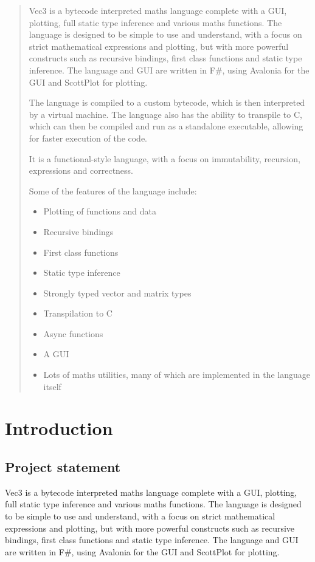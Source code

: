 \documentclass[a4paper, oneside, 11pt]{report}
\begin{document}
\begin{abstract}
Vec3 is a bytecode interpreted maths language complete with a GUI, plotting, full static type inference and various 
maths functions.
The language is designed to be simple to use and understand, with a focus on strict mathematical expressions and 
plotting, but with more powerful constructs such as recursive bindings, first class functions and static type inference.
The language and GUI are written in F\#, using Avalonia\citep{avalonia} for the GUI and ScottPlot\citep{scottPlot} for plotting.
    
The language is compiled to a custom bytecode, which is then interpreted by a virtual machine. 
The language also has the
ability to transpile to C, which can then be compiled and run as a standalone executable, allowing for faster execution of
the code.
    
It is a functional-style language, with a focus on immutability, recursion, expressions and correctness.

Some of the features of the language include:

\begin{itemize}
    \item Plotting of functions and data
    \item Recursive bindings
    \item First class functions
    \item Static type inference
    \item Strongly typed vector and matrix types
    \item Transpilation to C
    \item Async functions
    \item A GUI
    \item Lots of maths utilities, many of which are implemented in the language itself
\end{itemize}
    
\end{abstract}

\chapter{Introduction}\label{ch:intro}

\section{Project statement}\label{sec:project-statement}

Vec3 is a bytecode interpreted maths language complete with a GUI, plotting, full static type inference and various
maths functions.
The language is designed to be simple to use and understand, with a focus on strict mathematical expressions and plotting,
but with more powerful constructs such as recursive bindings, first class functions and static type inference.
The language and GUI are written in F\#, using Avalonia\citep{avalonia} for the GUI and ScottPlot\citep{scottPlot} for plotting.
\end{document}
